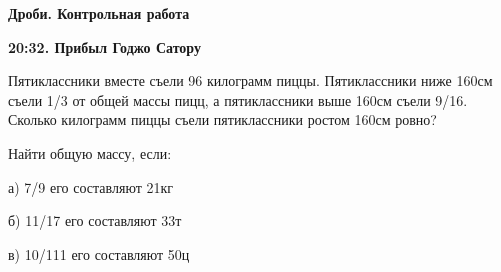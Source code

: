 \centerline{\bf \Huge Дроби. Контрольная работа}
\centerline{\bf \Huge }

\begin{flushright}
        \scriptsize{\textbf{20:32. Прибыл Годжо Сатору}}
\end{flushright}


 Пятиклассники вместе съели 96 килограмм пиццы. Пятиклассники ниже 160см съели 1/3 от общей массы пицц, а пятиклассники выше 160см съели 9/16. Сколько килограмм пиццы съели пятиклассники ростом 160см ровно? 

 Найти общую массу, если:

а) 7/9 его составляют 21кг

б) 11/17 его составляют 33т

в) 10/111 его составляют 50ц

